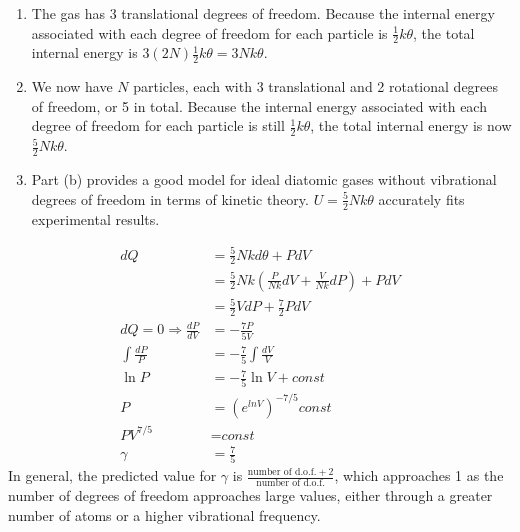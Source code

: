 \documentclass[a4paper,12pt]{article}
\begin{document}
\begin{enumerate}[label=\textbf{[\arabic*]}]
    \item
        \begin{enumerate}
            \item
                The gas has 3 translational degrees of freedom. Because the internal energy associated with each degree of freedom for each particle is $\frac{1}{2}k\theta$, the total internal energy is $3(2N)\frac{1}{2}k\theta = 3Nk\theta$.

            \item We now have $N$ particles, each with 3 translational and 2 rotational degrees of freedom, or 5 in total. Because the internal energy associated with each degree of freedom for each particle is still $\frac{1}{2}k\theta$, the total internal energy is now $\frac{5}{2}Nk\theta$.

            \item Part (b) provides a good model for ideal diatomic gases without vibrational degrees of freedom in terms of kinetic theory. $U = \frac{5}{2}Nk\theta$ accurately fits experimental results.
        \end{enumerate}

    \item
        \begin{align*}
            dQ &= \frac{5}{2}Nkd\theta + PdV \\
            &= \frac{5}{2} Nk \left( \frac{P}{Nk}dV + \frac{V}{Nk}dP \right) + P dV \\
            &= \frac{5}{2} V dP + \frac{7}{2} P dV \\
            dQ = 0 \Rightarrow \frac{dP}{dV} &= -\frac{7P}{5V} \\
            \int \frac{dP}{P} &= -\frac{7}{5} \int \frac{dV}{V} \\
            \ln{P} &= -\frac{7}{5} \ln{V} + \textit{const} \\
            P &= \left( e^{ln{V}} \right)^{-7/5} \textit{const} \\
            P V^{7/5} &= \textit{const} \\
            \gamma &= \frac{7}{5}
        \end{align*}
        In general, the predicted value for $\gamma$ is $\frac{\text{number of d.o.f.} + 2}{\text{number of d.o.f.}}$, which approaches 1 as the number of degrees of freedom approaches large values, either through a greater number of atoms or a higher vibrational frequency.


\end{enumerate}
\end{document}
